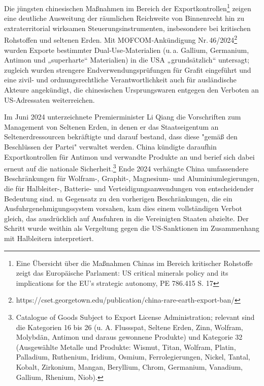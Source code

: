 \documentclass[12pt,a4paper,oneside]{book} %
\begin{document}
Die jüngsten chinesischen Maßnahmen im Bereich der Exportkontrollen\footnote{Eine Übersicht über die Maßnahmen Chinas im Bereich kritischer Rohstoffe zeigt das Europäische Parlament: US critical minerals policy and its implications for the EU’s strategic autonomy, PE 786.415 S. 17} zeigen eine deutliche Ausweitung der räumlichen Reichweite von Binnenrecht hin zu extraterritorial wirksamen Steuerungsinstrumenten, insbesondere bei kritischen Rohstoffen und seltenen Erden. Mit MOFCOM‑Ankündigung Nr. 46/2024\footnote{https://cset.georgetown.edu/publication/china-rare-earth-export-ban/} wurden Exporte bestimmter Dual‑Use‑Materialien (u. a. Gallium, Germanium, Antimon und „superharte“ Materialien) in die USA „grundsätzlich“ untersagt; zugleich wurden strengere Endverwendungsprüfungen für Grafit eingeführt und eine zivil‑ und ordnungsrechtliche Verantwortlichkeit auch für ausländische Akteure angekündigt, die chinesischen Ursprungswaren entgegen den Verboten an US‑Adressaten weiterreichen. 

Im Juni 2024 unterzeichnete Premierminister Li Qiang die Vorschriften zum Management von Seltenen Erden, in denen er das Staatseigentum an Seltenerdressourcen bekräftigte und darauf bestand, dass diese "gemäß den Beschlüssen der Partei" verwaltet werden. China kündigte daraufhin Exportkontrollen für Antimon und verwandte Produkte an und berief sich dabei erneut auf die nationale Sicherheit.\footnote{Catalogue of Goods Subject to Export License Administration; relevant sind die Kategorien 16 bis 26 (u. A. Flussspat, Seltene Erden, Zinn, Wolfram, Molybdän, Antimon und daraus gewonnene Produkte) und Kategorie 32 (Ausgewählte Metalle und Produkte: Wismut, Titan, Wolfram, Platin, Palladium, Ruthenium, Iridium, Osmium, Ferrolegierungen, Nickel, Tantal, Kobalt, Zirkonium, Mangan, Beryllium, Chrom, Germanium, Vanadium, Gallium, Rhenium, Niob).} Ende 2024 verhängte China umfassendere Beschränkungen für Wolfram-, Graphit-, Magnesium- und Aluminiumlegierungen, die für Halbleiter-, Batterie- und Verteidigungsanwendungen von entscheidender Bedeutung sind. m Gegensatz zu den vorherigen Beschränkungen, die ein Ausfuhrgenehmigungssystem vorsahen, kam dies einem vollständigen Verbot gleich, das ausdrücklich auf Ausfuhren in die Vereinigten Staaten abzielte. Der Schritt wurde weithin als Vergeltung gegen die US-Sanktionen im Zusammenhang mit Halbleitern interpretiert.
\end{document}
